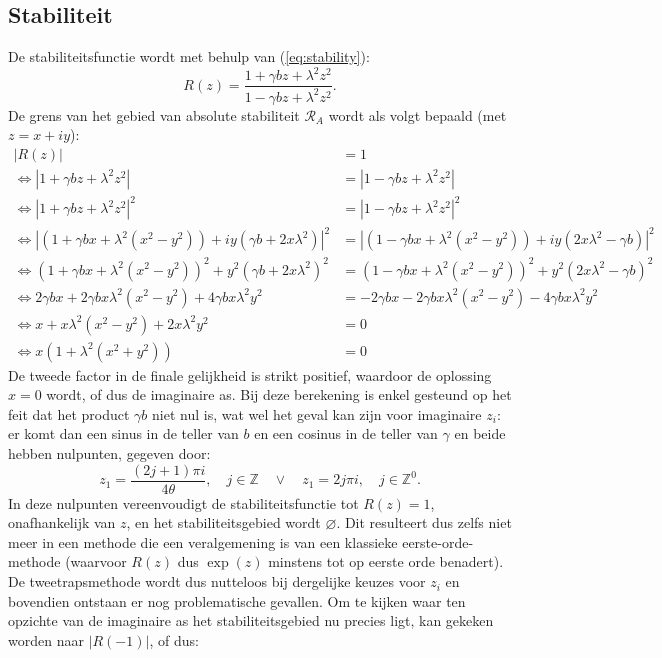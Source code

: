 \documentclass[12pt]{article}
\begin{document}
\subsection{Stabiliteit}
De stabiliteitsfunctie wordt met behulp van (\ref{eq:stability}):
\begin{equation}
    R(z)=\frac{1+\gamma b z+\lambda^2z^2}{1-\gamma b z+\lambda^2z^2}.
\end{equation}
De grens van het gebied van absolute stabiliteit \(\mathcal{R}_A\) wordt als volgt bepaald (met \(z=x+iy\)):
\begin{equation*}
    \begin{split}
        |R(z)|&=1\\
        \Leftrightarrow|1+\gamma b z+\lambda^2z^2|&=|1-\gamma b z+\lambda^2z^2| \\
        \Leftrightarrow|1+\gamma b z+\lambda^2z^2|^2&=|1-\gamma b z+\lambda^2z^2|^2 \\
        \Leftrightarrow|(1+\gamma bx+\lambda^2(x^2-y^2))+iy(\gamma b+2x\lambda^2)|^2&=|(1-\gamma bx+\lambda^2(x^2-y^2))+iy(2x\lambda^2-\gamma b)|^2 \\
        \Leftrightarrow(1+\gamma bx+\lambda^2(x^2-y^2))^2+y^2(\gamma b+2x\lambda^2)^2&=(1-\gamma bx+\lambda^2(x^2-y^2))^2+y^2(2x\lambda^2-\gamma b)^2 \\
        \Leftrightarrow2\gamma bx+2\gamma bx\lambda^2(x^2-y^2)+4\gamma bx\lambda^2y^2&=-2\gamma bx-2\gamma bx\lambda^2(x^2-y^2)-4\gamma bx\lambda^2y^2 \\
        \Leftrightarrow x+x\lambda^2(x^2-y^2)+2x\lambda^2y^2&=0 \\
        \Leftrightarrow x(1+\lambda^2(x^2+y^2))&=0
    \end{split}
\end{equation*}
De tweede factor in de finale gelijkheid is strikt positief, waardoor de oplossing \(x=0\) wordt, of dus de imaginaire as. Bij deze berekening is enkel gesteund op het feit dat het product \(\gamma b\) niet nul is, wat wel het geval kan zijn voor imaginaire \(z_i\): er komt dan een sinus in de teller van \(b\) en een cosinus in de teller van \(\gamma\) en beide hebben nulpunten, gegeven door:
\[z_1=\frac{(2j+1)\pi i}{4\theta},\quad j\in\mathbb{Z}\quad\vee\quad z_1=2j\pi i, \quad j\in\mathbb{Z}^0.\]
In deze nulpunten vereenvoudigt de stabiliteitsfunctie tot \(R(z)=1\), onafhankelijk van \(z\), en het stabiliteitsgebied wordt \(\varnothing\). Dit resulteert dus zelfs niet meer in een methode die een veralgemening is van een klassieke eerste-orde-methode (waarvoor \(R(z)\) dus \(\exp(z)\) minstens tot op eerste orde benadert). De tweetrapsmethode wordt dus nutteloos bij dergelijke keuzes voor \(z_i\) en bovendien ontstaan er nog problematische gevallen. Om te kijken waar ten opzichte van de imaginaire as het stabiliteitsgebied nu precies ligt, kan gekeken worden naar \(|R(-1)|\), of dus:
\end{document}

